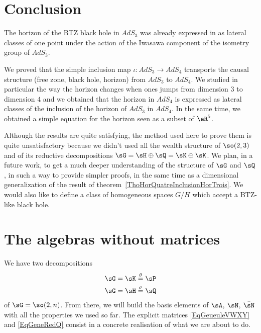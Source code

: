 	\section{Conclusion}

	The horizon of the BTZ black hole in $AdS_3$ was already expressed in \cite{Keio} as lateral classes of one point under the action of the Iwasawa component of the isometry group of $AdS_3$.

	We proved that the simple inclusion map $\iota\colon AdS_3\to AdS_4$ transports the causal structure (free zone, black hole, horizon) from $AdS_3$ to $AdS_4$. We studied in particular the way the horizon changes when ones jumps from dimension $3$ to dimension $4$ and we obtained that the horizon in $AdS_4$ is expressed as lateral classes of the inclusion of the horizon of $AdS_3$ in $AdS_4$. In the same time, we obtained a simple equation for the horizon seen as a subset of $\eR^5$.

	Although the results are quite satisfying, the method used here to prove them is quite unsatisfactory because we didn't used all the wealth structure of $\so(2,3)$ and of its reductive decompositions $\sG=\sH\oplus\sQ=\sK\oplus\sK$. We plan, in a future work, to get a much deeper understanding of the structure of $\sG$ and $\sQ$, in such a way to provide simpler proofs, in the same time as a dimensional generalization of the result of theorem~\ref{ThoHorQuatreInclusionHorTrois}. We would also like to define a class of homogeneous spaces $G/H$ which accept a BTZ-like black hole.


	\section{The algebras without matrices}
	\label{SecRebuildStructRoot}

	We have two decompositions
	\begin{equation}
		\begin{aligned}[]
			\sG & =\sK\stackrel{\theta}{=}\sP \\
			\sG & =\sH\stackrel{\sigma}{=}\sQ
		\end{aligned}
	\end{equation}
	of $\sG=\so(2,n)$. From there, we will build the basis elements of $\sA$, $\sN$, $\bar\sN$ with all the properties we used so far. The explicit matrices \eqref{EqGeueuleVWXY} and \eqref{EqGeneRedQ} consist in a concrete realisation of what we are about to do.

